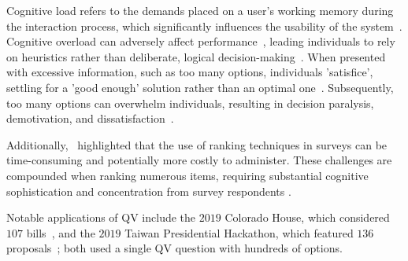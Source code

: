 Cognitive load refers to the demands placed on a user's working memory during the interaction process, which significantly influences the usability of the system~\cite{cooper1998research, seppCognitiveLoadTheory2019}. Cognitive overload can adversely affect performance~\cite{drommi2001interface}, leading individuals to rely on heuristics rather than deliberate, logical decision-making~\cite{daniel2017thinking}. When presented with excessive information, such as too many options, individuals 'satisfice', settling for a 'good enough' solution rather than an optimal one~\cite{simonBehavioralModelRational1955, payneAdaptiveStrategySelection1988, tverskyJudgmentsRepresentativeness}. Subsequently, too many options can overwhelm individuals, resulting in decision paralysis, demotivation, and dissatisfaction~\cite{iyengarWhenChoiceDemotivating2000}.

Additionally,~\textcite{alwinMeasurementValuesSurveys1985} highlighted that the use of ranking techniques in surveys can be time-consuming and potentially more costly to administer. These challenges are compounded when ranking numerous items, requiring substantial cognitive sophistication and concentration from survey respondents \cite{featherMeasurementValuesEffects1973}.

Notable applications of QV include the $2019$ Colorado House, which considered $107$ bills~\cite{coyNewWayVoting2019}, and the $2019$ Taiwan Presidential Hackathon, which featured $136$ proposals~\cite{QuadraticVotingFrontend2022}; both used a single QV question with hundreds of options.~


